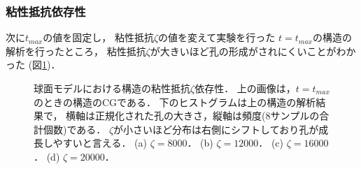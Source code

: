 \subsubsection{粘性抵抗依存性}
次に$t_{max}$の値を固定し，
粘性抵抗$\zeta$の値を変えて実験を行った
%     
$t=t_{max}$の構造の解析を行ったところ，
粘性抵抗$\zeta$が大きいほど孔の形成がされにくいことがわかった
(図\ref{fig:result_sphere_friction_constant_comb})．
%     
\begin{figure}
    \centering
    
    \caption{
        球面モデルにおける構造の粘性抵抗$\zeta$依存性．
        上の画像は，$t=t_{max}$のときの構造のCGである．
        下のヒストグラムは上の構造の解析結果で，
        横軸は正規化された孔の大きさ，縦軸は頻度(8サンプルの合計個数)である．
        $\zeta$が小さいほど分布は右側にシフトしており孔が成長しやすいと言える．
        (a) $\zeta=8000$．
        (b) $\zeta=12000$．
        (c) $\zeta=16000$．
        (d) $\zeta=20000$．
    }
    \label{fig:result_sphere_friction_constant_comb}
\end{figure}


